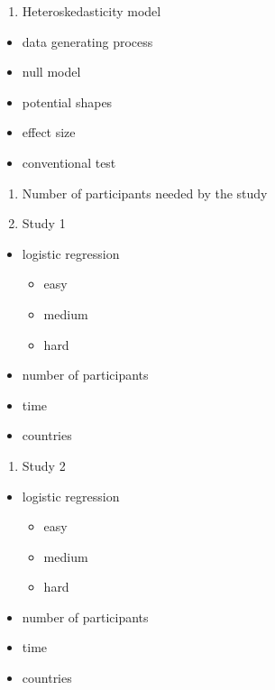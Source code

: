 \documentclass{monashthesis}
\begin{document}
\begin{enumerate}
\def\labelenumi{\arabic{enumi}.}
\setcounter{enumi}{3}
\tightlist
\item
  Heteroskedasticity model
\end{enumerate}

\begin{itemize}
\tightlist
\item
  data generating process
\item
  null model
\item
  potential shapes
\item
  effect size
\item
  conventional test
\end{itemize}

\begin{enumerate}
\def\labelenumi{\arabic{enumi}.}
\setcounter{enumi}{3}
\tightlist
\item
  Number of participants needed by the study
\item
  Study 1
\end{enumerate}

\begin{itemize}
\tightlist
\item
  logistic regression

  \begin{itemize}
  \tightlist
  \item
    easy
  \item
    medium
  \item
    hard
  \end{itemize}
\item
  number of participants
\item
  time
\item
  countries
\end{itemize}

\begin{enumerate}
\def\labelenumi{\arabic{enumi}.}
\setcounter{enumi}{3}
\tightlist
\item
  Study 2
\end{enumerate}

\begin{itemize}
\tightlist
\item
  logistic regression

  \begin{itemize}
  \tightlist
  \item
    easy
  \item
    medium
  \item
    hard
  \end{itemize}
\item
  number of participants
\item
  time
\item
  countries
\end{itemize}
\end{document}
